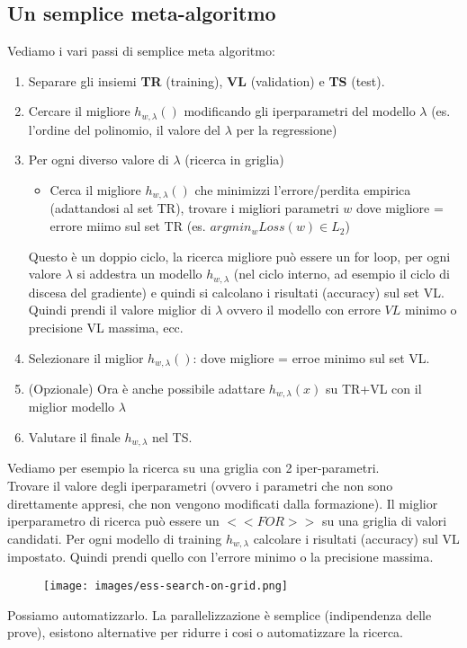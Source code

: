 \subsection{Un semplice meta-algoritmo}
Vediamo i vari passi di semplice meta algoritmo:
\begin{enumerate}
    \item Separare gli insiemi \textbf{TR} (training), \textbf{VL} (validation) e \textbf{TS} (test).
    \item Cercare il migliore $h_{w,\lambda}()$ modificando gli iperparametri del modello $\lambda$ (es. l'ordine del polinomio, il valore del $\lambda$ per la regressione)
    \item Per ogni diverso valore di $\lambda$ (ricerca in griglia)
    \begin{itemize}
        \item Cerca il migliore $h_{w,\lambda}()$ che minimizzi l'errore/perdita empirica (adattandosi al set TR), trovare i migliori parametri $w$ dove migliore = errore miimo sul set TR (es. $argmin_w Loss(w) \in L_2$) 
    \end{itemize}
    Questo è un doppio ciclo, la ricerca migliore può essere un for loop, per ogni valore $\lambda$ si addestra un modello $h_{w,\lambda}$ (nel ciclo interno, ad esempio il ciclo di discesa del gradiente) e quindi si calcolano i risultati (accuracy) sul set VL.
    Quindi prendi il valore miglior di $\lambda$ ovvero il modello con errore $VL$ minimo o precisione VL massima, ecc.
    \item Selezionare il miglior $h_{w, \lambda}()$: dove migliore = erroe minimo sul set VL.
    \item (Opzionale) Ora è anche possibile adattare $h_{w, \lambda}(x)$ su TR+VL con il miglior modello $\lambda$
    \item Valutare il finale $h_{w, \lambda}$ nel TS.  
\end{enumerate}

\begin{example}
    Vediamo per esempio la ricerca su una griglia con 2 iper-parametri.\\
    Trovare il valore degli iperparametri (ovvero i parametri che non sono direttamente appresi, che non vengono modificati dalla formazione). Il miglior
    iperparametro di ricerca può essere un $<<FOR>>$ su una griglia di valori candidati. Per ogni modello di training $h_{w, \lambda}$ calcolare i risultati (accuracy) sul VL impostato. 
    Quindi prendi quello con l'errore minimo o la precisione massima.
    \begin{figure}[h!]
        \centering
        \texttt{[image: images/ess-search-on-grid.png]}
    \end{figure}

    \hspace{-15pt}Possiamo automatizzarlo. La parallelizzazione è semplice (indipendenza delle prove), esistono alternative
    per ridurre i cosi o automatizzare la ricerca.
\end{example}

